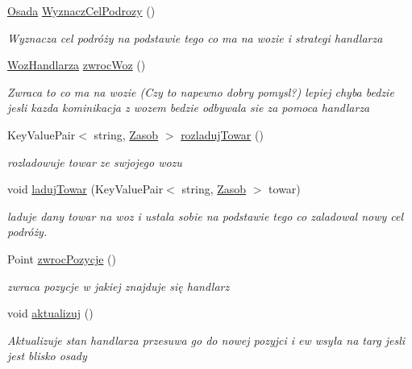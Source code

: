 \begin{DoxyCompactItemize}
\item 
\hyperlink{class_empire___simulator_1_1_osada}{Osada} \hyperlink{class_empire___simulator_1_1_handlarz_a2257fab877e2c0362adfea97823c09f4}{Wyznacz\+Cel\+Podrozy} ()
\begin{DoxyCompactList}\small\item\em Wyznacza cel podróży na podstawie tego co ma na wozie i strategi handlarza \end{DoxyCompactList}\item 
\hyperlink{class_empire___simulator_1_1_woz_handlarza}{Woz\+Handlarza} \hyperlink{class_empire___simulator_1_1_handlarz_aabded215d71b5fbcfec11027a8bf4593}{zwroc\+Woz} ()
\begin{DoxyCompactList}\small\item\em Zwraca to co ma na wozie (Czy to napewno dobry pomysl?) lepiej chyba bedzie jesli kazda kominikacja z wozem bedzie odbywala sie za pomoca handlarza \end{DoxyCompactList}\item 
Key\+Value\+Pair$<$ string, \hyperlink{class_empire___simulator_1_1_zasob}{Zasob} $>$ \hyperlink{class_empire___simulator_1_1_handlarz_a4c3a0bb8e7fcbaf374c42c70c0979b29}{rozladuj\+Towar} ()
\begin{DoxyCompactList}\small\item\em rozladowuje towar ze swjojego wozu \end{DoxyCompactList}\item 
void \hyperlink{class_empire___simulator_1_1_handlarz_adc85cfddd7e9edf1aa2eaaa064e765c9}{laduj\+Towar} (Key\+Value\+Pair$<$ string, \hyperlink{class_empire___simulator_1_1_zasob}{Zasob} $>$ towar)
\begin{DoxyCompactList}\small\item\em laduje dany towar na woz i ustala sobie na podstawie tego co zaladowal nowy cel podróży. \end{DoxyCompactList}\item 
Point \hyperlink{class_empire___simulator_1_1_handlarz_ae6c1178490e2a429ece397f5b3a656d9}{zwroc\+Pozycje} ()
\begin{DoxyCompactList}\small\item\em zwraca pozycje w jakiej znajduje się handlarz \end{DoxyCompactList}\item 
void \hyperlink{class_empire___simulator_1_1_handlarz_a1d1c6dbfb9b01f787a5bd2d87ff2011b}{aktualizuj} ()
\begin{DoxyCompactList}\small\item\em Aktualizuje stan handlarza przesuwa go do nowej pozyjci i ew wsyła na targ jesli jest blisko osady \end{DoxyCompactList}\item 

\end{DoxyCompactItemize}
